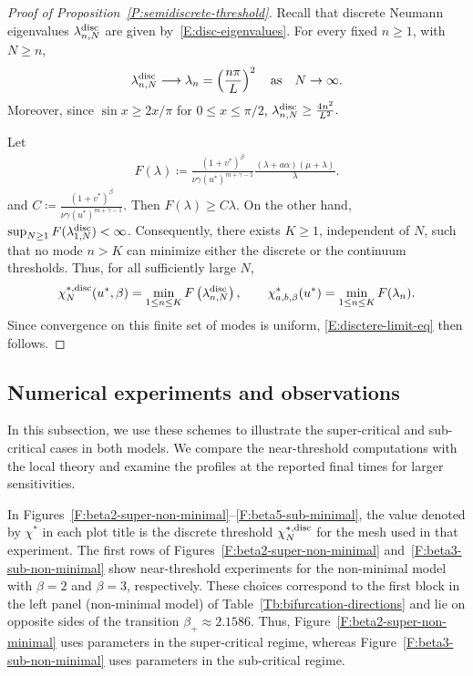 \documentclass[11pt]{article} %
\theoremstyle{remark}
\theoremstyle{remark}
\numberwithin{equation}{section}
\numberwithin{figure}{section}
\numberwithin{table}{section}
\begin{document}
\begin{proof}[Proof of Proposition~\ref{P:semidiscrete-threshold}]
  Recall that discrete Neumann eigenvalues $\lambda_{n,N}^{\rm disc}$ are given
  by~\eqref{E:disc-eigenvalues}. For every fixed $n \ge 1$, with $N \ge n$,
  \[
    \lambda_{n,N}^{\rm disc}
    \longrightarrow
    \lambda_n
    =
    \left(\frac{n\pi}{L}\right)^2 \quad { {\rm as}\quad N\to\infty}.
  \]
  Moreover, since $\sin x \ge 2x/\pi$ for $0 \le x \le \pi/2$, $
  \lambda_{n,N}^{\rm disc} \ge \frac{4n^2}{L^2}.$


  Let
  \begin{align}\label{E:chi_N-disc}
    F(\lambda)
    \coloneqq
    \frac{(1+v^*)^\beta}
    {\nu\gamma (u^*)^{m+\gamma-1}}
    \frac{(\lambda+a\alpha)(\mu+\lambda)}{\lambda}.
  \end{align}
  and $C\coloneqq \frac{(1+v^*)^\beta} {\nu\gamma (u^*)^{m+\gamma-1}}$. Then
  $F(\lambda) \ge C\lambda$. On the other hand, $\sup_{N\ge1}
  F(\lambda_{1,N}^{\rm disc}) < \infty$. Consequently, there exists $K \ge 1$,
  independent of $N$, such that no mode $n > K$ can minimize either the discrete
  or the continuum thresholds. Thus, for all sufficiently large $N$,
  \[
    \chi_N^{*,{\rm disc}}(u^*,\beta)
    =
    \min_{1\le n\le K}
    F\left(\lambda_{n,N}^{\rm disc}\right),
    \qquad
    \chi_{a,b,\beta}^*(u^*)
    =
    \min_{1\le n\le K}F(\lambda_n).
  \]
  Since convergence on this finite set of modes is uniform,
  \eqref{E:disctere-limit-eq} then follows.
\end{proof}


\subsection{Numerical experiments and observations}
\label{SS:experiments}

In this subsection, we use these schemes to illustrate the super-critical and
sub-critical cases in both models. We compare the near-threshold computations
with the local theory and examine the profiles at the reported final times for
larger sensitivities.

In Figures~\ref{F:beta2-super-non-minimal}--\ref{F:beta5-sub-minimal}, the value
denoted by $\chi^*$ in each plot title is the discrete threshold $\chi_N^{*,
{\rm disc}}$ for the mesh used in that experiment. The first rows of
Figures~\ref{F:beta2-super-non-minimal} and~\ref{F:beta3-sub-non-minimal} show
near-threshold experiments for the non-minimal model with $\beta = 2$ and $\beta
= 3$, respectively. These choices correspond to the first block in the left
panel (non-minimal model) of Table~\ref{Tb:bifurcation-directions} and lie on
opposite sides of the transition $\beta_+\approx2.1586$. Thus,
Figure~\ref{F:beta2-super-non-minimal} uses parameters in the super-critical
regime, whereas Figure~\ref{F:beta3-sub-non-minimal} uses parameters in the
sub-critical regime.
\end{document}
